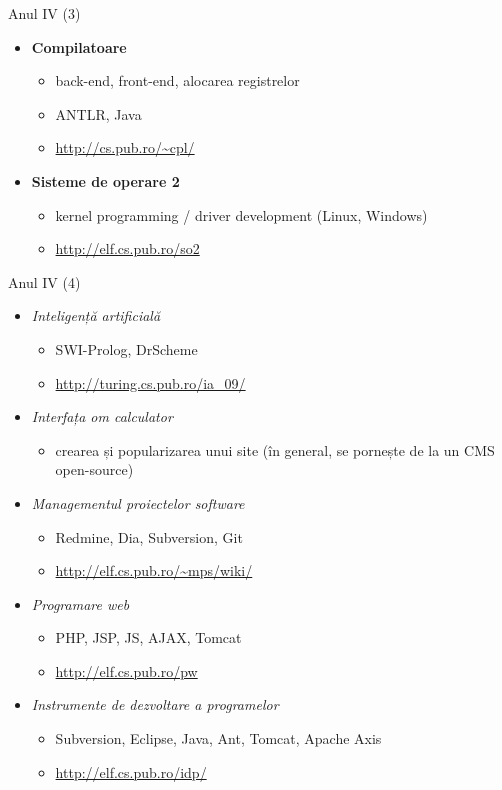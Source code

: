 \documentclass{beamer}
\begin{document}
\begin{frame}{Anul IV (3)}
	\begin{itemize}
		\item \textbf{Compilatoare}
			\begin{itemize}
				\item back-end, front-end, alocarea registrelor
				\item ANTLR, Java
				\item \url{http://cs.pub.ro/~cpl/}
			\end{itemize}
		\item \textbf{Sisteme de operare 2}
			\begin{itemize}
				\item kernel programming / driver development (Linux, Windows)
				\item \url{http://elf.cs.pub.ro/so2}
			\end{itemize}
	\end{itemize}
\end{frame}

\begin{frame}{Anul IV (4)}
	\begin{itemize}
		\item \textit{Inteligență artificială}
			\begin{itemize}
				\item SWI-Prolog, DrScheme
				\item \url{http://turing.cs.pub.ro/ia_09/}
			\end{itemize}
		\item \textit{Interfața om calculator}
			\begin{itemize}
				\item crearea și popularizarea unui site (în general, se
				pornește de la un CMS open-source)
			\end{itemize}
		\item \textit{Managementul proiectelor software}
			\begin{itemize}
				\item Redmine, Dia, Subversion, Git
				\item \url{http://elf.cs.pub.ro/~mps/wiki/}
			\end{itemize}
		\item \textit{Programare web}
			\begin{itemize}
				\item PHP, JSP, JS, AJAX, Tomcat
				\item \url{http://elf.cs.pub.ro/pw}
			\end{itemize}
		\item \textit{Instrumente de dezvoltare a programelor}
			\begin{itemize}
				\item Subversion, Eclipse, Java, Ant, Tomcat, Apache Axis
				\item \url{http://elf.cs.pub.ro/idp/}
			\end{itemize}
	\end{itemize}
\end{frame}
\end{document}
